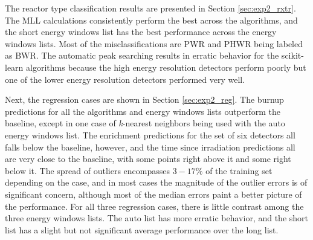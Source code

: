 The reactor type classification results are presented in Section
\ref{sec:exp2_rxtr}.  The \gls{MLL} calculations consistently perform the best
across the algorithms, and the short energy windows list has the best
performance across the energy windows lists.  Most of the misclassifications are
\gls{PWR} and \gls{PHWR} being labeled as \gls{BWR}.  The automatic peak
searching results in erratic behavior for the scikit-learn algorithms because
the high energy resolution detectors perform poorly but one of the lower energy
resolution detectors performed very well. 

Next, the regression cases are shown in Section \ref{sec:exp2_reg}.  The burnup
predictions for all the algorithms and energy windows lists outperform the
baseline, except in one case of \textit{k}-nearest neighbors being used with
the auto energy windows list.  The enrichment predictions for the set of six
detectors all falls below the baseline, however, and the time since irradiation
predictions all are very close to the baseline, with some points right above it
and some right below it.  The spread of outliers encompasses $3-17\%$ of the
training set depending on the case, and in most cases the magnitude of the
outlier errors is of significant concern, although most of the median errors
paint a better picture of the performance.  For all three regression cases,
there is little contrast among the three energy windows lists. The auto list
has more erratic behavior, and the short list has a slight but not significant
average performance over the long list. 

